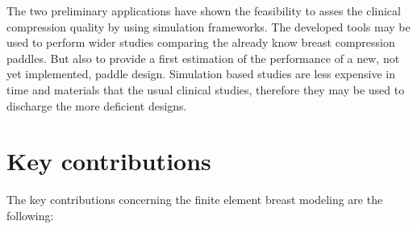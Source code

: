 The two preliminary applications have shown the feasibility  to asses the clinical compression quality by using simulation frameworks. The developed tools may be used to perform wider studies comparing the already know breast compression paddles. But also to provide a first estimation of the performance of a new, not yet implemented, paddle design. Simulation based studies are less expensive in time and materials that the usual clinical studies, therefore they may be used to discharge the more deficient designs.

\cleardoublepage



\chapter*{Key contributions}\label{section:keycontributions}

The key contributions concerning the finite element breast modeling are the following:

